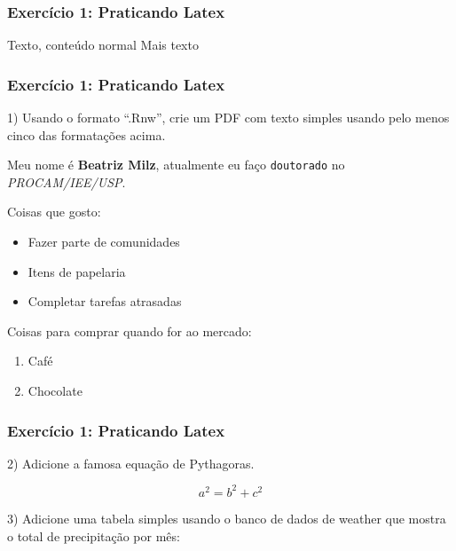 \documentclass{beamer}\usepackage[]{graphicx}\usepackage[]{color}
\begin{document}
\begin{frame} 
\frametitle{Exercício 1: Praticando Latex} 
Texto, conteúdo normal 
Mais texto 
\end{frame}



\begin{frame} 
\frametitle{Exercício 1: Praticando Latex} 

1) Usando o formato “.Rnw”, crie um PDF com texto simples usando pelo menos cinco das formatações acima.\hfill\break

Meu nome é \textbf{Beatriz Milz}, atualmente eu faço \texttt{doutorado} no \emph{PROCAM/IEE/USP}. \break


Coisas que gosto:

\begin{itemize}
  \item Fazer parte de comunidades
  \item Itens de papelaria
  \item Completar tarefas atrasadas
\end{itemize}


Coisas para comprar quando for ao mercado:

\begin{enumerate}
  \item Café
  \item Chocolate
\end{enumerate}

\end{frame}


\begin{frame} 
\frametitle{Exercício 1: Praticando Latex} 
2) Adicione a famosa equação de Pythagoras.

$$a^{2} = b^{2} + c^{2} $$
\end{frame}





3) Adicione uma tabela simples usando o banco de dados de weather que mostra o total de precipitação por mês:
\end{document}
